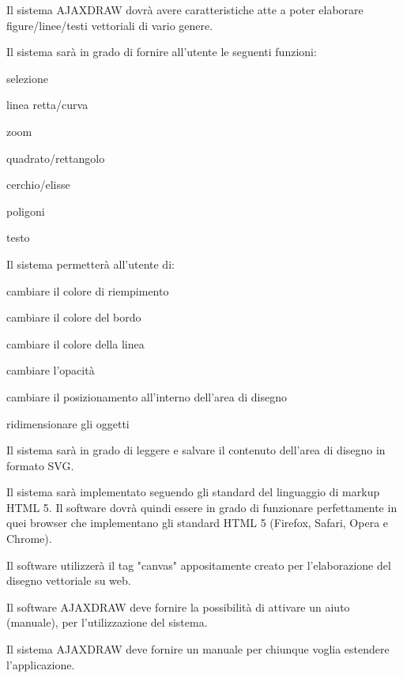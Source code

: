 \newpage


\begin{elenconumerato}{\subsecindent}
\item Il sistema AJAXDRAW dovr\`a avere caratteristiche atte a poter elaborare figure/linee/testi vettoriali di vario genere.
\item Il sistema sar\`a in grado di fornire all'utente le seguenti funzioni:

\begin{list}{-}{}
\item selezione
\item linea retta/curva
\item zoom
\item quadrato/rettangolo
\item cerchio/elisse
\item poligoni
\item testo
\end{list}

\item Il sistema permetter\`a all'utente di:

\begin{list}{-}{}
\item cambiare il colore di riempimento
\item cambiare il colore del bordo
\item cambiare il colore della linea
\item cambiare l'opacit\`a
\item cambiare il posizionamento all'interno dell'area di disegno
\item ridimensionare gli oggetti
\end{list}

\item Il sistema sar\`a in grado di leggere e salvare il contenuto dell'area di disegno in formato SVG.
\item Il sistema sar\`a implementato seguendo gli standard del linguaggio di markup HTML 5. Il software dovr\`a quindi essere in grado di funzionare perfettamente in quei browser che implementano gli standard HTML 5 (Firefox, Safari, Opera e Chrome). 
\item Il software utilizzer\`a il tag "canvas" appositamente creato per l'elaborazione del disegno vettoriale su web.
\item Il software AJAXDRAW deve fornire la possibilit\`a di attivare un aiuto (manuale), per l'utilizzazione del sistema. 
\item Il sistema AJAXDRAW deve fornire un manuale per chiunque voglia estendere l'applicazione. 
\end{elenconumerato}

